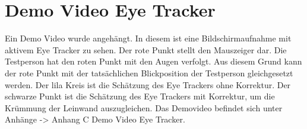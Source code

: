 \chapter{Demo Video Eye Tracker}
\label{sec:appendixC}

Ein Demo Video wurde angehängt. In diesem ist eine Bildschirmaufnahme mit aktivem Eye Tracker zu sehen. Der rote Punkt stellt den Mauszeiger dar. Die Testperson hat den roten Punkt mit den Augen verfolgt. Aus diesem Grund kann der rote Punkt mit der tatsächlichen Blickposition der Testperson gleichgesetzt werden. Der lila Kreis ist die Schätzung des Eye Trackers ohne Korrektur. Der schwarze Punkt ist die Schätzung des Eye Trackers mit Korrektur, um die Krümmung der Leinwand auszugleichen. Das Demovideo befindet sich unter Anhänge -> Anhang C Demo Video Eye Tracker.